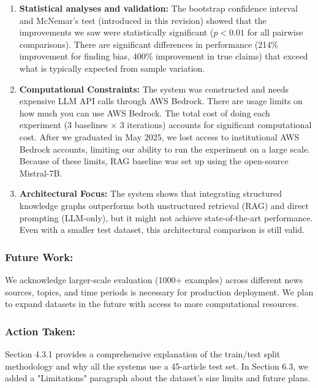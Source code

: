 \documentclass[11pt]{article}
\begin{document}
\begin{enumerate}
    \item \textbf{Statistical analyses and validation:}
    The bootstrap confidence interval and McNemar's test (introduced in this revision) showed that the improvements we saw were statistically significant ($p < 0.01$ for all pairwise comparisons). There are significant differences in performance (214\% improvement for finding bias, 400\% improvement in true claims) that exceed what is typically expected from sample variation.
     

    
    \item \textbf{Computational Constraints:}
    The system was constructed and needs expensive LLM API calls through AWS Bedrock. There are usage limits on how much you can use AWS Bedrock.  The total cost of doing each experiment (3 baselines × 3 iterations) accounts for significant computational cost. After we graduated in May 2025, we lost access to institutional AWS Bedrock accounts, limiting our ability to run the experiment on a large scale. Because of these limits, RAG baseline was set up using the open-source Mistral-7B.

    
    \item \textbf{Architectural Focus:}
    The system shows that integrating structured knowledge graphs outperforms both unstructured retrieval (RAG) and direct prompting (LLM-only), but it might not achieve state-of-the-art performance. Even with a smaller test dataset, this architectural comparison is still valid.

   \end{enumerate} 

\subsubsection*{Future Work:}
We acknowledge larger-scale evaluation (1000+ examples) across different news sources, topics, and time periods is necessary for production deployment. We plan to expand datasets in the future with access to more computational resources.



\subsubsection*{Action Taken:}
Section 4.3.1 provides a comprehensive explanation of the train/test split methodology and why all the systems use a 45-article test set. In Section 6.3, we added a "Limitations" paragraph about the dataset's size limits and future plans.
\end{document}
